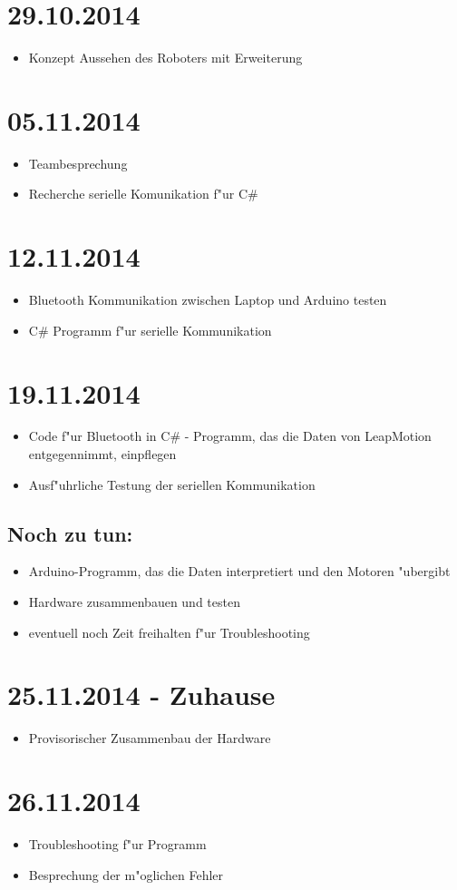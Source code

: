 \documentclass[11pt,a4paper]{article}
\begin{document}
\section*{29.10.2014}

\begin{itemize}
\item Konzept Aussehen des Roboters mit Erweiterung
\end{itemize}


\section*{05.11.2014}

\begin{itemize}
\item Teambesprechung
\item Recherche serielle Komunikation f"ur C\#
\end{itemize}


\section*{12.11.2014}

\begin{itemize}
\item Bluetooth Kommunikation zwischen Laptop und Arduino testen
\item C\# Programm f"ur serielle Kommunikation
\end{itemize}


\section*{19.11.2014}

\begin{itemize}
\item Code f"ur Bluetooth in C\# - Programm, das die Daten von LeapMotion entgegennimmt, einpflegen
\item Ausf"uhrliche Testung der seriellen Kommunikation
\end{itemize}

\subsection*{Noch zu tun:}
\begin{itemize}
\item Arduino-Programm, das die Daten interpretiert und den Motoren "ubergibt
\item Hardware zusammenbauen und testen
\item eventuell noch Zeit freihalten f"ur Troubleshooting
\end{itemize}


\section*{25.11.2014 - Zuhause}
\begin{itemize}
\item Provisorischer Zusammenbau der Hardware
\end{itemize}


\section*{26.11.2014}
\begin{itemize}
\item Troubleshooting f"ur Programm
\item Besprechung der m"oglichen Fehler
\end{itemize}
\end{document}
